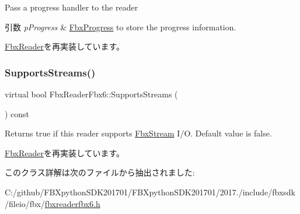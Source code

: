 Pass a progress handler to the reader 
\begin{DoxyParams}{引数}
{\em p\+Progress} & \hyperlink{class_fbx_progress}{Fbx\+Progress} to store the progress information. \\
\hline
\end{DoxyParams}


\hyperlink{class_fbx_reader_aeba190e276718b1abfa6c26a83d2c363}{Fbx\+Reader}を再実装しています。

\mbox{\label{class_fbx_reader_fbx6_ad38deb810e2c73562b9748486f4476bb}} 
\subsubsection{\texorpdfstring{Supports\+Streams()}{SupportsStreams()}}
{\footnotesize\ttfamily virtual bool Fbx\+Reader\+Fbx6\+::\+Supports\+Streams (\begin{DoxyParamCaption}{ }\end{DoxyParamCaption}) const\hspace{0.3cm}{\ttfamily [virtual]}}

Returns true if this reader supports \hyperlink{class_fbx_stream}{Fbx\+Stream} I/O. Default value is false. 

\hyperlink{class_fbx_reader_ab08a9e71a059ef6052e7fe2d8ba6c35d}{Fbx\+Reader}を再実装しています。



このクラス詳解は次のファイルから抽出されました\+:\begin{DoxyCompactItemize}
\item 
C\+:/github/\+F\+B\+Xpython\+S\+D\+K201701/\+F\+B\+Xpython\+S\+D\+K201701/2017./include/fbxsdk/fileio/fbx/\hyperlink{fbxreaderfbx6_8h}{fbxreaderfbx6.\+h}\end{DoxyCompactItemize}
